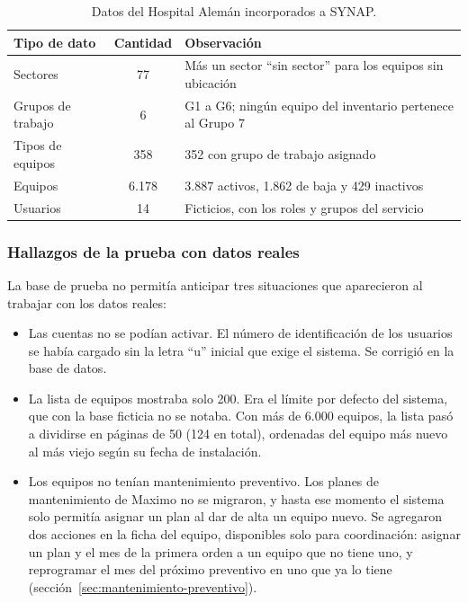 \documentclass[10pt]{article}
\begin{document}
\begin{table}[H]
    \caption{Datos del Hospital Alemán incorporados a SYNAP.}
    \label{tab:datos-incorporados}
    \centering
    \renewcommand{\arraystretch}{1.5}
    \begin{tabular*}{\linewidth}{@{\extracolsep{\fill}}lcl@{}}
        \toprule
        \textbf{Tipo de dato} & \textbf{Cantidad} & \textbf{Observación} \\
        \midrule
        Sectores & 77 & Más un sector “sin sector” para los equipos sin ubicación \\
        Grupos de trabajo & 6 & G1 a G6; ningún equipo del inventario pertenece al Grupo 7 \\
        Tipos de equipos & 358 & 352 con grupo de trabajo asignado \\
        Equipos & 6.178 & 3.887 activos, 1.862 de baja y 429 inactivos \\
        Usuarios & 14 & Ficticios, con los roles y grupos del servicio \\
        \bottomrule
    \end{tabular*}
\end{table}

\subsubsection{Hallazgos de la prueba con datos reales}
\label{sec:hallazgos-datos-reales}
La base de prueba no permitía anticipar tres situaciones que aparecieron al trabajar con los datos reales:

\begin{itemize}
    \item Las cuentas no se podían activar. El número de identificación de los usuarios se había cargado sin la letra “u” inicial que exige el sistema. Se corrigió en la base de datos.
    \item La lista de equipos mostraba solo 200. Era el límite por defecto del sistema, que con la base ficticia no se notaba. Con más de 6.000 equipos, la lista pasó a dividirse en páginas de 50 (124 en total), ordenadas del equipo más nuevo al más viejo según su fecha de instalación.
    \item Los equipos no tenían mantenimiento preventivo. Los planes de mantenimiento de Maximo no se migraron, y hasta ese momento el sistema solo permitía asignar un plan al dar de alta un equipo nuevo. Se agregaron dos acciones en la ficha del equipo, disponibles solo para coordinación: asignar un plan y el mes de la primera orden a un equipo que no tiene uno, y reprogramar el mes del próximo preventivo en uno que ya lo tiene (sección~\ref{sec:mantenimiento-preventivo}).
\end{itemize}
\end{document}
